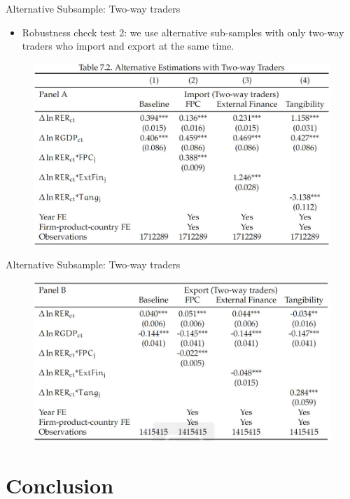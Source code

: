 \documentclass[10pt]{beamer}
\begin{document}
\begin{frame}{Alternative Subsample: Two-way traders}
	\begin{itemize}
		\item Robustness check test 2: we use alternative sub-samples with only two-way traders who import and export at the same time.
	\end{itemize}
	\begin{figure}[htbp]
		\centering
		\includegraphics[width=0.9\columnwidth]{Table7.2A.jpg}
		\label{tab7.2A}
	\end{figure}
\end{frame}

\begin{frame}{Alternative Subsample: Two-way traders}
	\begin{figure}[htbp]
		\centering
		\includegraphics[width=0.9\columnwidth]{Table7.2B.jpg}
		\label{tab7.2B}
	\end{figure}
\end{frame}

\section{Conclusion}
\end{document}
